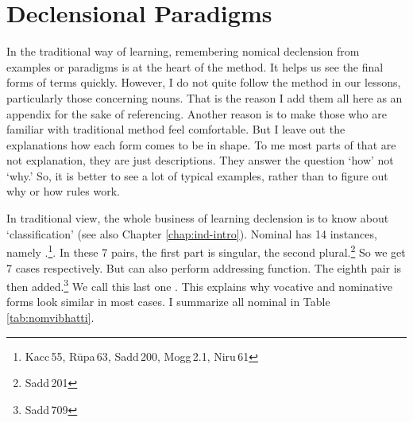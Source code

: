 \chapter{Declensional Paradigms}\label{chap:decl}

In the traditional way of learning, remembering nomical declension from examples or paradigms is at the heart of the method. It helps us see the final forms of terms quickly. However, I do not quite follow the method in our lessons, particularly those concerning nouns. That is the reason I add them all here as an appendix for the sake of referencing. Another reason is to make those who are familiar with traditional method feel comfortable. But I leave out the explanations how each form comes to be in shape. To me most parts of that are not explanation, they are just descriptions. They answer the question `how' not `why.' So, it is better to see a lot of typical examples, rather than to figure out why or how rules work.

In traditional view, the whole business of learning declension is to know about  `classification' (see also Chapter \ref{chap:ind-intro}). Nominal  has 14 instances, namely .\footnote{Kacc\,55, R\=upa\,63, Sadd\,200, Mogg\,2.1, Niru\,61}. In these 7 pairs, the first part is singular, the second plural.\footnote{Sadd\,201} So we get 7 cases respectively. But  can also perform addressing function. The eighth pair is then added.\footnote{Sadd\,709} We call this last one . This explains why vocative and nominative forms look similar in most cases. I summarize all nominal  in Table \ref{tab:nomvibhatti}.

